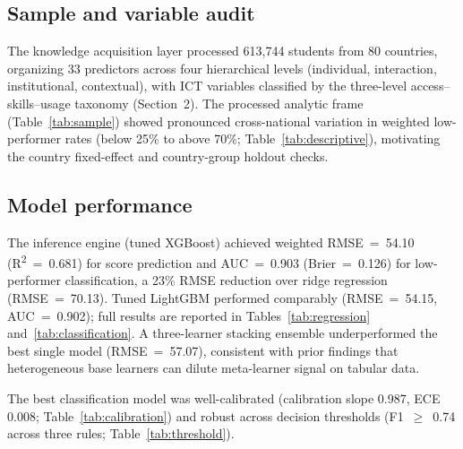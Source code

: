 
\subsection{Sample and variable audit}

The knowledge acquisition layer processed 613,744 students from 80 countries, organizing 33 predictors across four hierarchical levels (individual, interaction, institutional, contextual), with ICT variables classified by the three-level access--skills--usage taxonomy (Section~2). The processed analytic frame (Table~\ref{tab:sample}) showed pronounced cross-national variation in weighted low-performer rates (below 25\% to above 70\%; Table~\ref{tab:descriptive}), motivating the country fixed-effect and country-group holdout checks.





\FloatBarrier
\subsection{Model performance}

The inference engine (tuned XGBoost) achieved weighted RMSE~=~54.10 (R\textsuperscript{2}~=~0.681) for score prediction and AUC~=~0.903 (Brier~=~0.126) for low-performer classification, a 23\% RMSE reduction over ridge regression (RMSE~=~70.13). Tuned LightGBM performed comparably (RMSE~=~54.15, AUC~=~0.902); full results are reported in Tables~\ref{tab:regression} and~\ref{tab:classification}. A three-learner stacking ensemble underperformed the best single model (RMSE~=~57.07), consistent with prior findings that heterogeneous base learners can dilute meta-learner signal on tabular data.



\FloatBarrier



\FloatBarrier
\clearpage

The best classification model was well-calibrated (calibration slope 0.987, ECE 0.008; Table~\ref{tab:calibration}) and robust across decision thresholds (F1~$\geq$~0.74 across three rules; Table~\ref{tab:threshold}).

